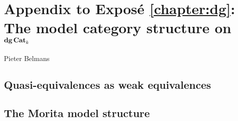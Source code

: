 \chapter*{Appendix to Expos\'e \ref{chapter:dg}: The model category structure on $\mathbf{dg\,Cat}_k$}
\begin{flushright}
  Pieter Belmans
\end{flushright}

\begin{refsection}
\printbibliography[heading = local]

\setcounter{section}{0}
\renewcommand{\thesection}{\thechapter.\Alph{section}}

\section{Quasi-equivalences as weak equivalences}

\section{The Morita model structure}

\printbibliography[heading = local]

\end{refsection}

\renewcommand{\thesection}{\thechapter.\arabic{section}}

